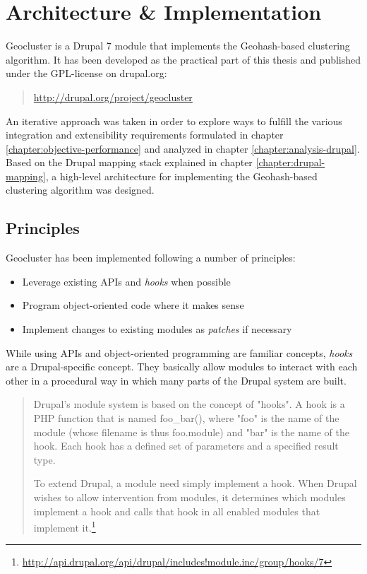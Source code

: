 
%
%

\section{Architecture \& Implementation}
\label{chapter:architecture-implementation}

Geocluster is a Drupal 7 module that implements the Geohash-based clustering algorithm. It has been developed as the practical part of this thesis and published under the GPL-license on drupal.org:

\begin{quote}
\url{http://drupal.org/project/geocluster}
\end{quote}
 
An iterative approach was taken in order to explore ways to fulfill the various integration and extensibility requirements formulated in chapter \ref{chapter:objective-performance} and analyzed in chapter \ref{chapter:analysis-drupal}. Based on the Drupal mapping stack explained in chapter \ref{chapter:drupal-mapping}, a high-level architecture for implementing the Geohash-based clustering algorithm was designed.

\subsection{Principles}

Geocluster has been implemented following a number of principles:

\begin{itemize}

\item Leverage existing APIs and \textit{hooks} when possible
\item Program object-oriented code where it makes sense
\item Implement changes to existing modules as \textit{patches} if necessary

\end{itemize}

While using APIs and object-oriented programming are familiar concepts, \textit{hooks} are a Drupal-specific concept. They basically allow modules to interact with each other in a procedural way in which many parts of the Drupal system are built.

\begin{quote}
Drupal's module system is based on the concept of "hooks". A hook is a PHP function that is named foo\_bar(), where "foo" is the name of the module (whose filename is thus foo.module) and "bar" is the name of the hook. Each hook has a defined set of parameters and a specified result type.

To extend Drupal, a module need simply implement a hook. When Drupal wishes to allow intervention from modules, it determines which modules implement a hook and calls that hook in all enabled modules that implement it.\footnote{\url{http://api.drupal.org/api/drupal/includes!module.inc/group/hooks/7}}
\end{quote}


